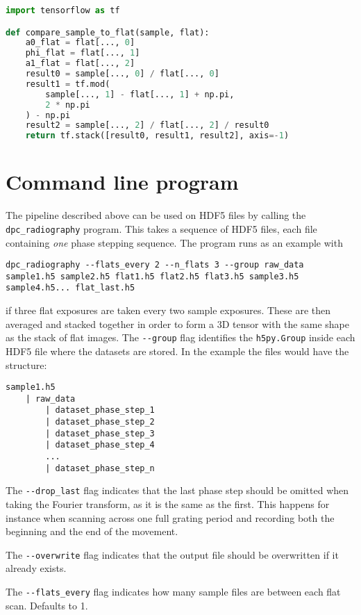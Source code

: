 \begin{lstlisting}[language=Python]
import tensorflow as tf

def compare_sample_to_flat(sample, flat):
    a0_flat = flat[..., 0]
    phi_flat = flat[..., 1]
    a1_flat = flat[..., 2]
    result0 = sample[..., 0] / flat[..., 0]
    result1 = tf.mod(
        sample[..., 1] - flat[..., 1] + np.pi,
        2 * np.pi
    ) - np.pi
    result2 = sample[..., 2] / flat[..., 2] / result0
    return tf.stack([result0, result1, result2], axis=-1)
\end{lstlisting}

\section{Command line program}
The pipeline described above can be used on HDF5 files by calling the
\texttt{dpc\_radiography} program. This takes a sequence of HDF5 files, each
file containing \emph{one} phase stepping sequence.
The program runs as an example with
\begin{lstlisting}
dpc_radiography --flats_every 2 --n_flats 3 --group raw_data sample1.h5 sample2.h5 flat1.h5 flat2.h5 flat3.h5 sample3.h5 sample4.h5... flat_last.h5
\end{lstlisting}
if three flat exposures are taken every two sample exposures. These are then
averaged and stacked together in order to form a 3D tensor with the same
shape as the stack of flat images.
The \verb|--group| flag identifies the \texttt{h5py.Group} inside 
each HDF5 file where the datasets are stored. In the example the
files would have the structure:
\begin{lstlisting}
sample1.h5
    | raw_data
        | dataset_phase_step_1
        | dataset_phase_step_2
        | dataset_phase_step_3
        | dataset_phase_step_4
        ...
        | dataset_phase_step_n
\end{lstlisting}

The \verb|--drop_last| flag indicates that the last phase step should be
omitted when taking the Fourier transform, as it is the same as the first.
This happens for instance when scanning across one full grating period and
recording both the beginning and the end of the movement.

The \verb|--overwrite| flag indicates that the output file should be
overwritten if it already exists.

The \verb|--flats_every| flag indicates how many sample files are between
each flat scan. Defaults to 1.

